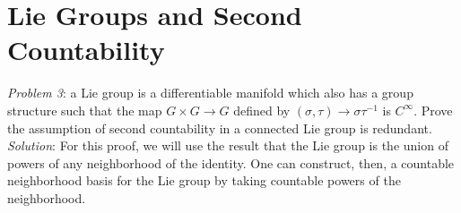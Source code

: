 \section{Lie Groups and Second Countability}

\emph{Problem 3}: a Lie group is a differentiable manifold which also has a
group structure such that the map $G\times G \to G$ defined by $(\sigma, \tau)
\to \sigma \tau^{-1}$ is $C^{\infty}$. Prove the assumption of second
countability in a connected Lie group is redundant.
\\

\emph{Solution}:
For this proof, we will use the result that the Lie group is the union of powers
of any neighborhood of the identity.
One can construct, then, a countable neighborhood basis for the Lie group by
taking countable powers of the neighborhood.
